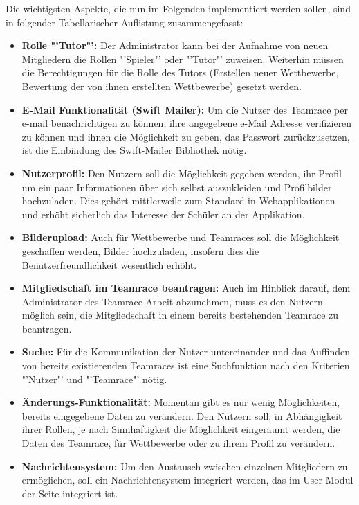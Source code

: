 \documentclass[12pt]{report}
\begin{document}
Die wichtigsten Aspekte, die nun im Folgenden implementiert werden sollen, sind in folgender Tabellarischer Auflistung zusammengefasst:
\begin{itemize}
\item{\textbf{Rolle "'Tutor"':} Der Administrator kann bei der Aufnahme von neuen Mitgliedern die Rollen "'Spieler"' oder "'Tutor"' zuweisen. Weiterhin müssen die Berechtigungen für die Rolle des Tutors (Erstellen neuer Wettbewerbe, Bewertung der von ihnen erstellten Wettbewerbe) gesetzt werden.}
\item{\textbf{E-Mail Funktionalität (Swift Mailer):} Um die Nutzer des Teamrace per e-mail benachrichtigen zu können, ihre angegebene e-Mail Adresse verifizieren zu können und ihnen die Möglichkeit zu geben, das Passwort zurückzusetzen, ist die Einbindung des Swift-Mailer Bibliothek nötig.}
\item{\textbf{Nutzerprofil:} Den Nutzern soll die Möglichkeit gegeben werden, ihr Profil um ein paar Informationen über sich selbst auszukleiden und Profilbilder hochzuladen. Dies gehört mittlerweile zum Standard in Webapplikationen und erhöht sicherlich das Interesse der Schüler an der Applikation.}
\item{\textbf{Bilderupload:} Auch für Wettbewerbe und Teamraces soll die Möglichkeit geschaffen werden, Bilder hochzuladen, insofern dies die Benutzerfreundlichkeit wesentlich erhöht.}
\item{\textbf{Mitgliedschaft im Teamrace beantragen:} Auch im Hinblick darauf, dem Administrator des Teamrace Arbeit abzunehmen, muss es den Nutzern möglich sein, die Mitgliedschaft in einem bereits bestehenden Teamrace zu beantragen.}
\item{\textbf{Suche:} Für die Kommunikation der Nutzer untereinander und das Auffinden von bereits existierenden Teamraces ist eine Suchfunktion nach den Kriterien "'Nutzer"' und "'Teamrace"' nötig. }
\item{\textbf{Änderungs-Funktionalität:} Momentan gibt es nur wenig Möglichkeiten, bereits eingegebene Daten zu verändern. Den Nutzern soll, in Abhängigkeit ihrer Rollen, je nach Sinnhaftigkeit die Möglichkeit eingeräumt werden, die Daten des Teamrace, für Wettbewerbe oder zu ihrem Profil zu verändern.}
\item{\textbf{Nachrichtensystem:} Um den Austausch zwischen einzelnen Mitgliedern zu ermöglichen, soll ein Nachrichtensystem integriert werden, das im User-Modul der Seite integriert ist.}
\end{itemize}
\end{document}
